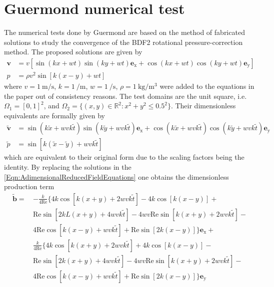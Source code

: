 \documentclass[]{scrartcl}
\newcommand{\bs}[1]{\boldsymbol{#1}}
\begin{document}
\section{Guermond numerical test}
The numerical tests done by Guermond are based on the method of fabricated solutions to study the convergence of the BDF2 rotational pressure-correction method. The proposed solutions are given by
\begin{equation*}
	\begin{aligned}
	\bs{v} &= v[\sin(kx+wt)\sin(ky+wt)  \bs{e}_\textrm{x} + \cos(kx+wt)\cos(ky+wt)  \bs{e}_\textrm{y}] \\
	p &=\rho v^2 \sin[k(x-y)+wt]
	\end{aligned}
\end{equation*}
where $v = \SI{1}{\meter\per\second}$, $k = \SI{1}{\per\meter}$, $w = \SI{1}{\per\second}$, $\rho = \SI{1}{\kilogram\per\meter^3}$ were added to the equations in the paper out of consistency reasons. The test domains are the unit square, i.e. $\Omega_1 = [0,1]^2$, and $\Omega_2 = \lbrace(x,y)\in\mathbb{R}^2: x^2+y^2 \le 0.5^2\rbrace$. Their dimensionless equivalents are formally given by
\begin{equation*}
	\begin{aligned}
		\bs{\tilde{v}} &= \sin(k\tilde{x}+wvk\tilde{t})\sin(k\tilde{y}+wvk\tilde{t})  \bs{e}_\textrm{x} + \cos(k\tilde{x}+wvk\tilde{t})\cos(k\tilde{y}+wvk\tilde{t})  \bs{e}_\textrm{y} \\
		\tilde{p} &=\sin[k(\tilde{x}-\tilde{y})+wvk\tilde{t}]
	\end{aligned}
\end{equation*}
which are equivalent to their original form due to the scaling factors being the identity. By replacing the solutions in the \cref{Eqn:AdimensionalReducedFieldEquations} one obtains the dimensionless production term
\begin{equation*}
	\begin{aligned}
		\bs{\tilde{b}}=\, & -\frac{k}{4 \textrm{Re}}\lbrace 4 k  \cos [k(x+y)+2wvk\tilde{t}] - 4 k  \cos [k(x-y)] + \\
		& \textrm{Re}\sin [2 k L (x+y)+4wvk\tilde{t}] -4 wv \textrm{Re}\sin [k(x+y)+2wvk\tilde{t}] - \\
		& 4\textrm{Re}\cos [k(x-y)+wvk\tilde{t}] + \textrm{Re} \sin[2k(x-y)]\rbrace \bs{e}_\textrm{x} + \\
		              & \frac{k}{4 \textrm{Re}}\lbrace 4 k  \cos [k(x+y)+2wvk\tilde{t}] + 4 k  \cos [k(x-y)] - \\
		              & \textrm{Re}\sin [2 k  (x+y)+4wvk\tilde{t}] -4 wv \textrm{Re}\sin [k(x+y)+2wvk\tilde{t}] - \\
		              & 4\textrm{Re}\cos [k(x-y)+wvk\tilde{t}] + \textrm{Re} \sin[2k(x-y)]\rbrace \bs{e}_\textrm{y}
	\end{aligned}
\end{equation*}
\end{document}
